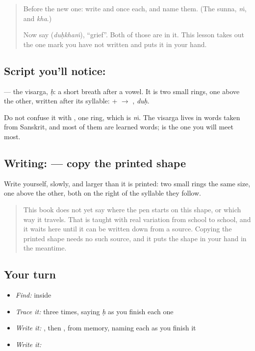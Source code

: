 \begin{quote}
Before the new one: write \textbf{} and \textbf{} once each, and name them. (The sunna, \emph{ṁ}, and \emph{kha}.)

Now say \textbf{} (\emph{duḥkhaṁ}), \textquotedblleft{}grief\textquotedblright{}. Both of those are in it. This lesson takes out the one mark you have not written and puts it in your hand.
\end{quote}

\subsection*{Script you'll notice: }
\textbf{} — the visarga, \emph{ḥ}: a short breath after a vowel. It is two small rings, one above the other, written after its syllable: \textbf{} + \textbf{} $\to$ \textbf{}, \emph{duḥ}.

Do not confuse it with \textbf{}, one ring, which is \emph{ṁ}. The visarga lives in words taken from Sanskrit, and most of them are learned words; \textbf{} is the one you will meet most.

\subsection*{Writing:  — copy the printed shape}
Write \textbf{} yourself, slowly, and larger than it is printed: two small rings the same size, one above the other, both on the right of the syllable they follow.

\begin{quote}
This book does not yet say where the pen starts on this shape, or which way it travels. That is taught with real variation from school to school, and it waits here until it can be written down from a source. Copying the printed shape needs no such source, and it puts the shape in your hand in the meantime.
\end{quote}

\subsection*{Your turn}
\begin{itemize}
\raggedright
  \item \emph{Find:}  inside \textbf{}
  \item \emph{Trace it:}  three times, saying \emph{ḥ} as you finish each one
  \item \emph{Write it:} , then , from memory, naming each as you finish it
  \item \emph{Write it:} \textbf{}
\end{itemize}

